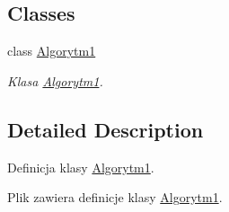 \subsection*{Classes}
\begin{DoxyCompactItemize}
\item 
class \hyperlink{a00002}{Algorytm1}
\begin{DoxyCompactList}\small\item\em Klasa \hyperlink{a00002}{Algorytm1}. \end{DoxyCompactList}\end{DoxyCompactItemize}


\subsection{Detailed Description}
Definicja klasy \hyperlink{a00002}{Algorytm1}. 

Plik zawiera definicje klasy \hyperlink{a00002}{Algorytm1}. 